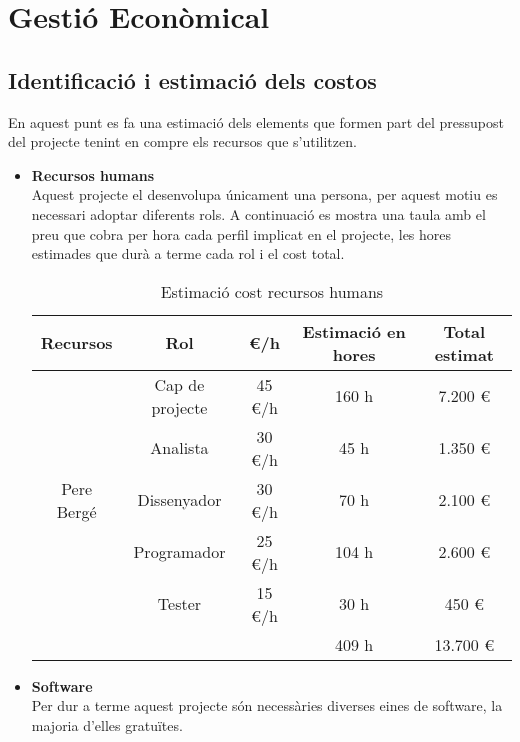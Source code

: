 
\chapter{Gestió Econòmical} %

\label{GestioEconomica} %

\section{Identificació i estimació dels costos}
En aquest punt es fa una estimació dels elements que formen part del pressupost del projecte tenint en compre els recursos que s’utilitzen.

\begin{itemize}
\item{}\textbf{Recursos humans}\\
Aquest projecte el desenvolupa únicament una persona, per aquest motiu
es necessari adoptar diferents rols. A continuació es mostra una taula amb
el preu que cobra per hora cada perfil implicat en el projecte, les hores
estimades que durà a terme cada rol i el cost total.



\begin{table}[!h]
\begin{tabular}{|c|c|c|c|c|}
\hline
\textbf{Recursos}  & \textbf{Rol} & \textbf{\euro/h} & \textbf{Estimació en hores} & \textbf{Total estimat} \\ \hline
 & Cap de projecte & 45 \euro/h & 160 h & 7.200 \euro \\ \cline {2-5}
\multicolumn{ 1}{|l|}{} & Analista & 30 \euro/h & 45 h & 1.350 \euro \\ \cline{ 2- 5}
Pere Bergé & Dissenyador & 30 \euro/h & 70 h & 2.100 \euro \\ \cline{ 2- 5}
\multicolumn{ 1}{|l|}{} & Programador & 25 \euro/h & 104 h & 2.600 \euro \\ \cline{ 2- 5}
\multicolumn{ 1}{|l|}{} & Tester & 15 \euro/h & 30 h & 450 \euro \\ \hline
\multicolumn{ 1}{|l|}{} &   &  & 409 h & 13.700 \euro \\ \hline
\end{tabular}
\label{}
\caption{Estimació cost recursos humans}
\end{table}

\item{}\textbf{Software}\\
Per dur a terme aquest projecte són necessàries diverses eines de software,
la majoria d’elles gratuïtes.


\end{itemize}
